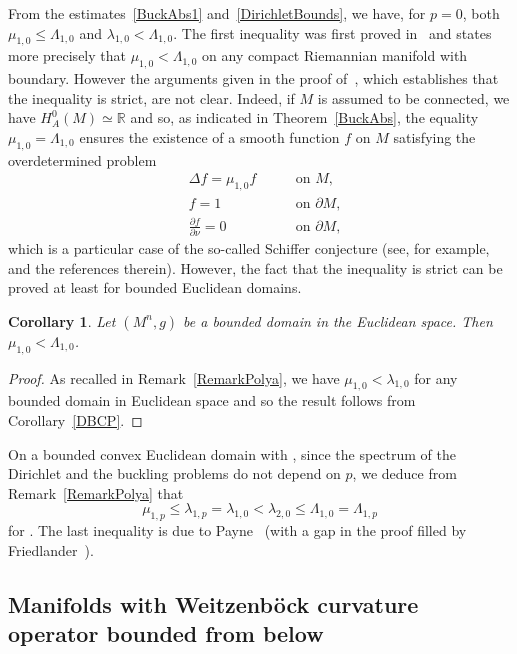 \documentclass[pdftex]{sigma}
\numberwithin{equation}{section}
\newtheorem{Corollary}[Theorem]{Corollary}
\theoremstyle{definition}
\begin{document}
From the estimates~\eqref{BuckAbs1} and~\eqref{DirichletBounds}, we have, for $p=0$, both $\mu_{1,0}\leq\Lambda_{1,0}$ and $\lambda_{1,0}<\Lambda_{1,0}$.
The first inequality was first proved in~\cite{IliasShouman2019} and states more precisely that $\mu_{1,0}<\Lambda_{1,0}$ on any compact Riemannian manifold with boundary. However the arguments given in the proof of~\cite[Lem\-ma~3.1]{IliasShouman2019}, which establishes that the inequality is strict, are not clear.
Indeed, if $M$ is assumed to be connected, we have $H^0_A(M)\simeq \mathbb{R}$ and so, as indicated in Theorem~\ref{BuckAbs}, the equality $\mu_{1,0}=\Lambda_{1,0}$ ensures the existence of a smooth function $f$ on $M$ satisfying the overdetermined problem
\[
\begin{aligned}
&\Delta f =\mu_{1,0} f\ \quad  &&\textrm{on } M,\\
&f = 1\ \quad && \textrm{on }\partial M,\\
&\frac{\partial f}{\partial \nu} = 0 \ \quad &&\textrm{on }\partial M,
\end{aligned}
\]
which is a particular case of the so-called Schiffer conjecture (see, for example,~\cite{ProvenzanoSavo2023} and the references therein).
However, the fact that the inequality is strict can be proved at least for bounded Euclidean domains.
\begin{Corollary}%
Let $(M^n,g)$ be a bounded domain in the Euclidean space. Then $\mu_{1,0}<\Lambda_{1,0}$.
\end{Corollary}

\begin{proof} As recalled in Remark~\ref{RemarkPolya}, we have $\mu_{1,0}<\lambda_{1,0}$ for any bounded domain in Euclidean space and so the result follows from Corollary~\ref{DBCP}.
\end{proof}

On a bounded convex Euclidean domain with , since the spectrum of the Dirichlet and the buckling problems do not depend on $p$, we deduce from Remark~\ref{RemarkPolya} that
\[
\mu_{1,p}\leq\lambda_{1,p}=\lambda_{1,0}<\lambda_{2,0}\leq\Lambda_{1,0}=\Lambda_{1,p}
\]
for .
The last inequality is due to Payne~\cite{Payne1955} (with a gap in the proof filled by Friedlander~\cite{Friedlander2004}).

\subsection{Manifolds with Weitzenb\"ock curvature operator bounded from below}
\end{document}
